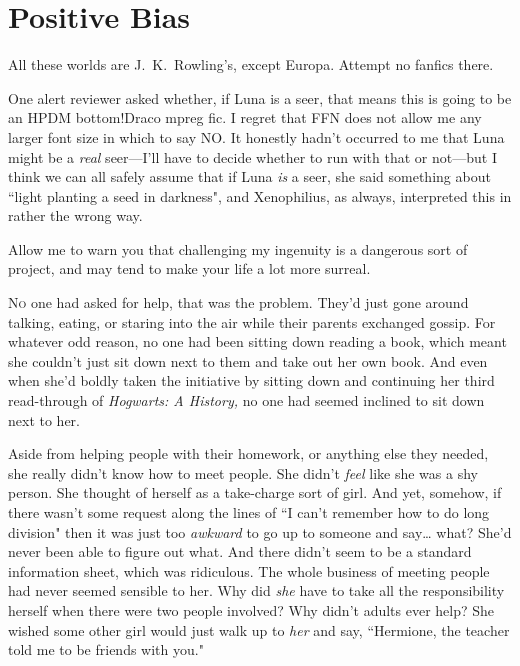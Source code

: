\chapter{Positive Bias}

\begin{chapterOpeningAuthorNote}
All these worlds are J.~K.~Rowling's, except Europa. Attempt no fanfics there.

One alert reviewer asked whether, if Luna is a seer, that means this is going to be an HPDM bottom!Draco mpreg fic. I regret that FFN does not allow me any larger font size in which to say NO. It honestly hadn't occurred to me that Luna might be a \emph{real} seer---I'll have to decide whether to run with that or not---but I think we can all safely assume that if Luna \emph{is} a seer, she said something about ``light planting a seed in darkness", and Xenophilius, as always, interpreted this in rather the wrong way.
\end{chapterOpeningAuthorNote}
\begin{chapterOpeningQuote}
Allow me to warn you that challenging my ingenuity is a dangerous sort of project, and may tend to make your life a lot more surreal.
\end{chapterOpeningQuote}

\lettrine{N}{o} one had asked for help, that was the problem. They'd just gone around talking, eating, or staring into the air while their parents exchanged gossip. For whatever odd reason, no one had been sitting down reading a book, which meant she couldn't just sit down next to them and take out her own book. And even when she'd boldly taken the initiative by sitting down and continuing her third read-through of \emph{Hogwarts: A History,} no one had seemed inclined to sit down next to her.

Aside from helping people with their homework, or anything else they needed, she really didn't know how to meet people. She didn't \emph{feel} like she was a shy person. She thought of herself as a take-charge sort of girl. And yet, somehow, if there wasn't some request along the lines of ``I can't remember how to do long division" then it was just too \emph{awkward} to go up to someone and say{\ldots} what? She'd never been able to figure out what. And there didn't seem to be a standard information sheet, which was ridiculous. The whole business of meeting people had never seemed sensible to her. Why did \emph{she} have to take all the responsibility herself when there were two people involved? Why didn't adults ever help? She wished some other girl would just walk up to \emph{her} and say, ``Hermione, the teacher told me to be friends with you."

